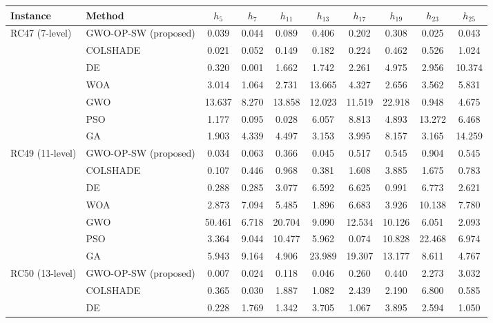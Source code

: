 \begin{tabular}{llcccccccc}
\hline
Instance & Method & $h_{5}$ & $h_{7}$ & $h_{11}$ & $h_{13}$ & $h_{17}$ & $h_{19}$ & $h_{23}$ & $h_{25}$ \\
\hline
\multirow{7}{*}{RC47 (7-level)} & GWO-OP-SW (proposed) & 0.039 & 0.044 & 0.089 & 0.406 & 0.202 & 0.308 & 0.025 & 0.043 \\
 & COLSHADE & 0.021 & 0.052 & 0.149 & 0.182 & 0.224 & 0.462 & 0.526 & 1.024 \\
 & DE & 0.320 & 0.001 & 1.662 & 1.742 & 2.261 & 4.975 & 2.956 & 10.374 \\
 & WOA & 3.014 & 1.064 & 2.731 & 13.665 & 4.327 & 2.656 & 3.562 & 5.831 \\
 & GWO & 13.637 & 8.270 & 13.858 & 12.023 & 11.519 & 22.918 & 0.948 & 4.675 \\
 & PSO & 1.177 & 0.095 & 0.028 & 6.057 & 8.813 & 4.893 & 13.272 & 6.468 \\
 & GA & 1.903 & 4.339 & 4.497 & 3.153 & 3.995 & 8.157 & 3.165 & 14.259 \\
\multirow{7}{*}{RC49 (11-level)} & GWO-OP-SW (proposed) & 0.034 & 0.063 & 0.366 & 0.045 & 0.517 & 0.545 & 0.904 & 0.545 \\
 & COLSHADE & 0.107 & 0.446 & 0.968 & 0.381 & 1.608 & 3.885 & 1.675 & 0.783 \\
 & DE & 0.288 & 0.285 & 3.077 & 6.592 & 6.625 & 0.991 & 6.773 & 2.621 \\
 & WOA & 2.873 & 7.094 & 5.485 & 1.896 & 6.683 & 3.926 & 10.138 & 7.780 \\
 & GWO & 50.461 & 6.718 & 20.704 & 9.090 & 12.534 & 10.126 & 6.051 & 2.093 \\
 & PSO & 3.364 & 9.044 & 10.477 & 5.962 & 0.074 & 10.828 & 22.468 & 6.974 \\
 & GA & 5.943 & 9.164 & 4.906 & 23.989 & 19.307 & 13.177 & 8.611 & 4.767 \\
\multirow{3}{*}{RC50 (13-level)} & GWO-OP-SW (proposed) & 0.007 & 0.024 & 0.118 & 0.046 & 0.260 & 0.440 & 2.273 & 3.032 \\
 & COLSHADE & 0.365 & 0.030 & 1.887 & 1.082 & 2.439 & 2.190 & 6.800 & 0.585 \\
 & DE & 0.228 & 1.769 & 1.342 & 3.705 & 1.067 & 3.895 & 2.594 & 1.050 \\
\hline
\end{tabular}
